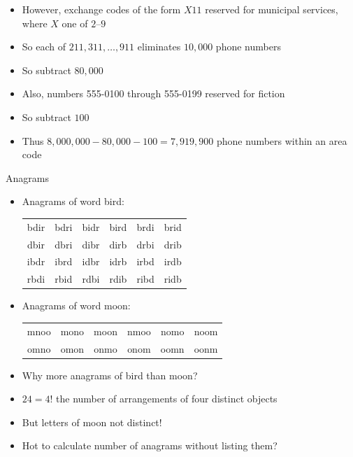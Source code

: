 \documentclass[handout]{beamer}
\theoremstyle{definition}
\begin{document}
\begin{frame}
\begin{itemize}
\item However, exchange codes of the form $X11$
reserved for municipal services, where $X$ one of $2$--$9$
\item So each of $211,311,\ldots,911$ eliminates $10,000$ phone numbers
\item So subtract $80,000$
\item Also, numbers 555-0100 through 555-0199 reserved for fiction
\item So subtract $100$
\item Thus $8,000,000-80,000-100=7,919,900$ phone numbers within an area code
\end{itemize}
\end{frame}

\begin{frame}{Anagrams}
\begin{itemize}
\item Anagrams of word \alert{bird}:
\begin{tabular}{cccccc}
bdir &bdri &bidr &bird &brdi &brid\\
dbir &dbri &dibr &dirb &drbi &drib\\
ibdr &ibrd &idbr &idrb &irbd &irdb\\
rbdi &rbid &rdbi &rdib &ribd &ridb 
\end{tabular}
\item Anagrams of word \alert{moon}:
\begin{tabular}{cccccc}
mnoo &mono &moon &nmoo &nomo &noom\\
omno &omon &onmo &onom &oomn &oonm 
\end{tabular}
\item Why more anagrams of \alert{bird} than \alert{moon}?
\item $24=4!$ the number of arrangements of four \alert{distinct} objects
\item But letters of \alert{moon} not distinct!
\item Hot to calculate number of anagrams without listing them?
\end{itemize}
\end{frame}
\end{document}
